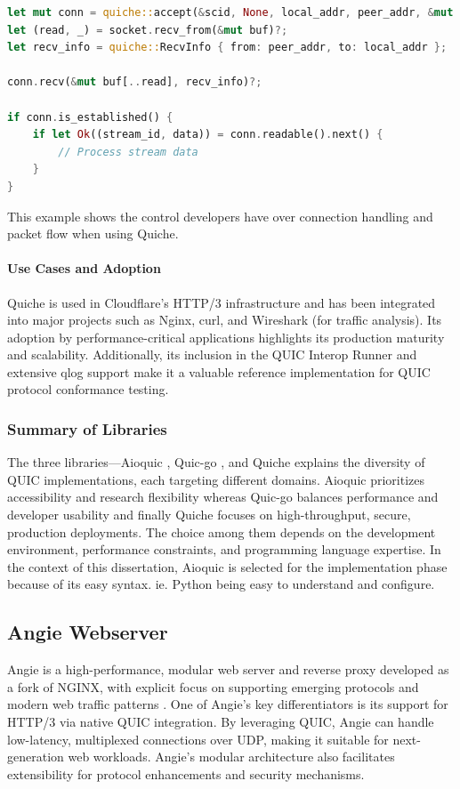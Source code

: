 \begin{lstlisting}[language=rust]
let mut conn = quiche::accept(&scid, None, local_addr, peer_addr, &mut config)?;
let (read, _) = socket.recv_from(&mut buf)?;
let recv_info = quiche::RecvInfo { from: peer_addr, to: local_addr };

conn.recv(&mut buf[..read], recv_info)?;

if conn.is_established() {
    if let Ok((stream_id, data)) = conn.readable().next() {
        // Process stream data
    }
}
\end{lstlisting}

This example shows the control developers have over connection handling and packet flow when using Quiche.

\paragraph{Use Cases and Adoption}
Quiche is used in Cloudflare's HTTP/3 infrastructure and has been integrated into major projects such as Nginx, curl, and Wireshark (for traffic analysis). Its adoption by performance-critical applications highlights its production maturity and scalability. Additionally, its inclusion in the QUIC Interop Runner and extensive qlog support make it a valuable reference implementation for QUIC protocol conformance testing.

\subsubsection{Summary of Libraries}
The three libraries—Aioquic \cite{aioquic-repo}, Quic-go \cite{quic-go-repo}, and Quiche \cite{quiche-repo} explains the diversity of QUIC implementations, each targeting different domains. Aioquic prioritizes accessibility and research flexibility whereas Quic-go balances performance and developer usability and finally Quiche focuses on high-throughput, secure, production deployments. The choice among them depends on the development environment, performance constraints, and programming language expertise. In the context of this dissertation, Aioquic is selected for the implementation phase because of its easy syntax.  ie. Python being easy to understand and configure.

\subsection{Angie Webserver}
Angie is a high-performance, modular web server and reverse proxy developed as a fork of NGINX, with explicit focus on supporting emerging protocols and modern web traffic patterns \cite{angie-docs}. One of Angie's key differentiators is its support for HTTP/3 via native QUIC integration. By leveraging QUIC, Angie can handle low-latency, multiplexed connections over UDP, making it suitable for next-generation web workloads. Angie's modular architecture also facilitates extensibility for protocol enhancements and security mechanisms.

